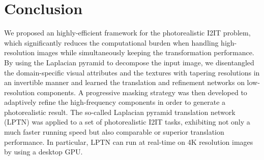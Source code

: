 \documentclass[10pt,twocolumn,letterpaper]{article}
\begin{document}
	\section{Conclusion}
	
	We proposed an highly-efficient framework for the photorealistic I2IT problem, which significantly reduces the computational burden when handling high-resolution images while simultaneously keeping the transformation performance. By using the Laplacian pyramid to decompose the input image, we disentangled the domain-specific visual attributes and the textures with tapering resolutions in an invertible manner and learned the translation and refinement networks on low-resolution components. A progressive masking strategy was then developed to adaptively refine the high-frequency components in order to generate a photorealistic result. The so-called Laplacian pyramid translation network (LPTN) was applied to a set of photorealistic I2IT tasks, exhibiting not only a much faster running speed but also comparable or superior translation performance. In particular, LPTN can run at real-time on 4K resolution images by using a desktop GPU.

{\small


}
\end{document}
